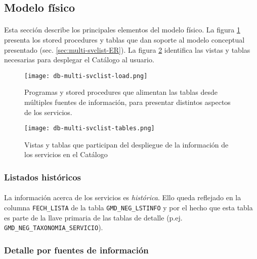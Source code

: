 \subsection{Modelo f\'isico}\label{sec:multi-svclist-phys}
\paragraph{}
Esta secci\'on describe los principales elementos del modelo f\'isico.
La figura \ref{fig:db-multi-load} presenta los stored procedures y tablas
que dan soporte al modelo conceptual
presentado (sec. \ref{sec:multi-svclist-ER}).
La figura \ref{fig:db-multi-tables} identifica las vistas y tablas necesarias para
desplegar el Cat\'alogo al usuario.


\begin{figure}[htb]
    \centering
    \texttt{[image: db-multi-svclist-load.png]}
    \caption{Programas y stored procedures que alimentan las tablas desde m\'ultiples fuentes de informaci\'on, para presentar distintos aspectos de los servicios.}
    \label{fig:db-multi-load}
\end{figure}


\begin{figure}[htb]
    \centering
    \texttt{[image: db-multi-svclist-tables.png]}
    \caption{Vistas y tablas que participan del despliegue de la informaci\'on de los servicios en el Cat\'alogo}
    \label{fig:db-multi-tables}
\end{figure}


\subsubsection{Listados hist\'oricos}
\paragraph{}
La informaci\'on acerca de los servicios es \emph{hist\'orica}.
Ello queda reflejado en la columna \verb|FECH_LISTA| de la tabla
\verb|GMD_NEG_LSTINFO| y por el hecho que esta tabla es parte de la llave primaria
de las tablas de detalle (p.ej. \verb|GMD_NEG_TAXONOMIA_SERVICIO|).


\subsubsection{Detalle por fuentes de informaci\'on}
